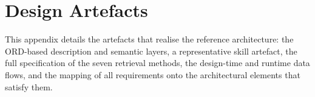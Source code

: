 \clearpage

\section{Design Artefacts}
\label{appendix:design}
\setcounter{subsection}{0}

This appendix details the artefacts that realise the reference architecture: the ORD-based description and semantic layers, a representative skill artefact, the full specification of the seven retrieval methods, the design-time and runtime data flows, and the mapping of all requirements onto the architectural elements that satisfy them.




